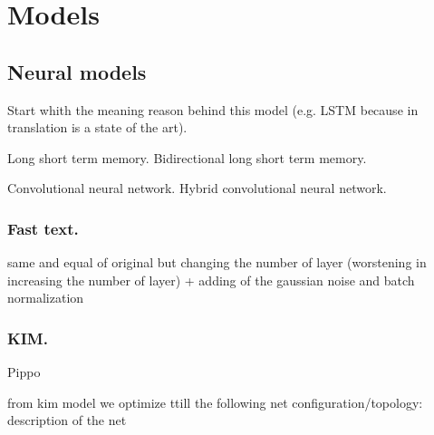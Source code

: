 \section{Models}

 	

\subsection{Neural models}

Start whith the meaning reason behind this model (e.g. LSTM because in translation is a state of the art).

Long short term memory.
Bidirectional long short term memory.

Convolutional neural network.
Hybrid convolutional neural network.

\subsubsection{Fast text.}

same and equal of original but changing the number of layer  (worstening in increasing the number of layer) + adding of the gaussian noise and batch normalization

\subsubsection{KIM.}

Pippo \cite{kim2014convolutional}



from kim model we optimize ttill the following net configuration/topology: description of the net